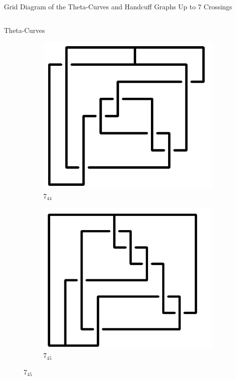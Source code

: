 \documentclass[final]{beamer}
\begin{document}
\begin{frame}[t]
\begin{alertblock}{Grid Diagram of the Theta-Curves and Handcuff Graphs Up to 7 Crossings}
\begin{columns}[t]
\begin{column}{0.5\textwidth}
\begin{alertblock}{Theta-Curves}
\begin{figure}
\begin{subfigure}{0.075\textwidth}
    \end{subfigure}
    \begin{subfigure}{0.075\textwidth}
    \includegraphics[width=\columnwidth]{../Midterm_Poster/grid_diagram/theta_7_44.png}
    \caption{$7_{44}$} 
    \end{subfigure}
    \begin{subfigure}{0.075\textwidth}
    \includegraphics[width=\columnwidth]{../Midterm_Poster/grid_diagram/theta_7_45.png}
    \caption{$7_{45}$} 
    \end{subfigure}

\end{figure}
\end{alertblock}
\end{column}
\end{columns}
\end{alertblock}
\end{frame}
\end{document}

